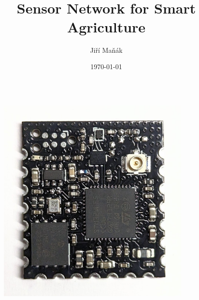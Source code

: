 \documentclass{beamer}
\title{Sensor Network for Smart Agriculture}
\author{Jiří Maňák}
\date{\today}
\begin{document}
\begin{frame}
\titlepage
\end{frame}

\begin{frame}
\begin{columns}[T]
\begin{column}{.5\textwidth}
    \begin{figure}
        \centering
        \includegraphics[width=\linewidth]{img/module-v0.1.jpg}
    \end{figure}
\end{column}
\hfil
\begin{column}{.5\textwidth}
    \begin{figure}
        \centering

\end{figure}
\end{column}
\end{columns}
\end{frame}
\end{document}
